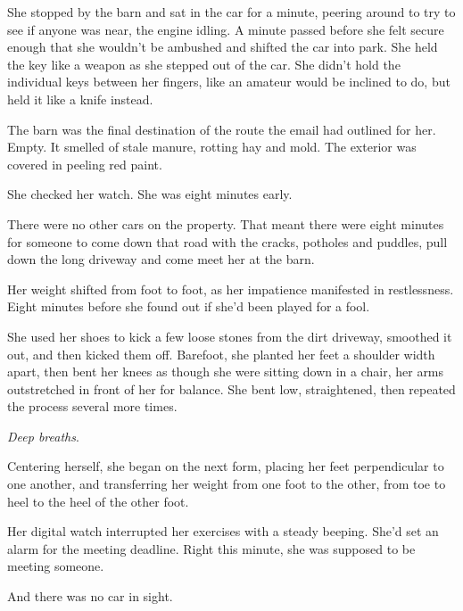 She stopped by the barn and sat in the car for a minute, peering around to try to see if anyone was near, the engine idling.  A minute passed before she felt secure enough that she wouldn't be ambushed and shifted the car into park.  She held the key like a weapon as she stepped out of the car.  She didn't hold the individual keys between her fingers, like an amateur would be inclined to do, but held it like a knife instead.



The barn was the final destination of the route the email had outlined for her.  Empty.  It smelled of stale manure, rotting hay and mold.  The exterior was covered in peeling red paint.



She checked her watch.  She was eight minutes early.



There were no other cars on the property.  That meant there were eight minutes for someone to come down that road with the cracks, potholes and puddles, pull down the long driveway and come meet her at the barn.



Her weight shifted from foot to foot, as her impatience manifested in restlessness.  Eight minutes before she found out if she'd been played for a fool.



She used her shoes to kick a few loose stones from the dirt driveway, smoothed it out, and then kicked them off.  Barefoot, she planted her feet a shoulder width apart, then bent her knees as though she were sitting down in a chair, her arms outstretched in front of her for balance.  She bent low, straightened, then repeated the process several more times.



\emph{Deep breaths}.



Centering herself, she began on the next form, placing her feet perpendicular to one another, and transferring her weight from one foot to the other, from toe to heel to the heel of the other foot.



Her digital watch interrupted her exercises with a steady beeping.  She'd set an alarm for the meeting deadline.  Right this minute, she was supposed to be meeting someone.



And there was no car in sight.



